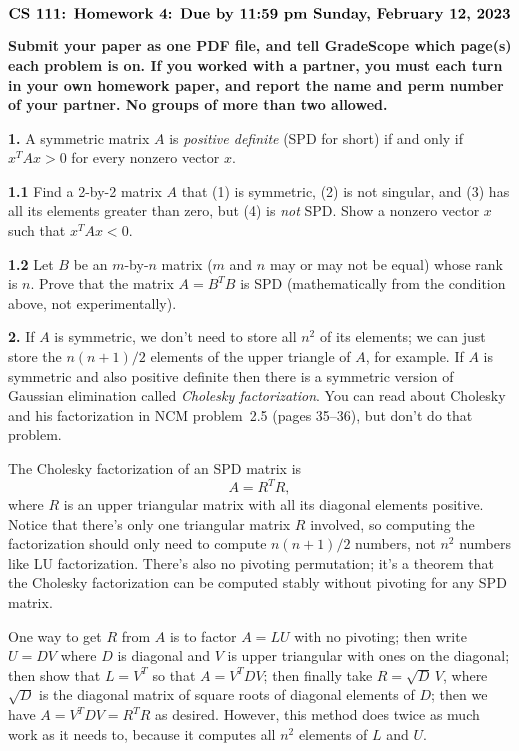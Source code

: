 \documentclass[11pt]{article}
\begin{document}
$$\mbox{\Large \bf CS 111: Homework 4: Due by 11:59 pm Sunday, February 12, 2023}$$
\par\smallskip\noindent
{\bf Submit your paper as one PDF file,
and tell GradeScope which page(s) each problem is on.
If you worked with a partner, you must each turn in your own 
homework paper, and report the name and perm number of your partner.
No groups of more than two allowed.
}

\par\bigskip
{\bf 1.} A symmetric matrix $A$ is {\em positive definite}
(SPD for short) if and only if $x^TAx>0$ for every nonzero vector $x$.

\par\medskip
{\bf 1.1} Find a 2-by-2 matrix $A$ that (1) is symmetric, (2) is not singular,
and (3) has all its elements greater than zero, but (4) is {\em not} SPD.
Show a nonzero vector $x$ such that $x^TAx<0$.

\par\medskip
{\bf 1.2} Let $B$ be an $m$-by-$n$ matrix ($m$ and $n$ may or may not be equal) 
whose rank is $n$.
Prove that the matrix $A=B^TB$ is SPD (mathematically from the condition above, 
not experimentally).

\par\bigskip
{\bf 2.} 
If $A$ is symmetric, we don't need to store all $n^2$ of its elements; 
we can just store the $n(n+1)/2$ elements of the upper triangle of $A$, for example.
If $A$ is symmetric and also positive definite then there is a symmetric
version of Gaussian elimination called {\em Cholesky factorization}.
You can read about Cholesky and his factorization in NCM problem~2.5 (pages 35--36),
but don't do that problem. 

The Cholesky factorization of an SPD matrix is
$$A = R^TR,$$
where $R$ is an upper triangular matrix with all its diagonal elements positive.
Notice that there's only one triangular matrix $R$ involved, so computing
the factorization should only need to compute $n(n+1)/2$ numbers, 
not $n^2$ numbers like LU factorization.
There's also no pivoting permutation; 
it's a theorem that the Cholesky factorization can be computed stably
without pivoting for any SPD matrix.

One way to get $R$ from $A$ is to factor $A=LU$ with no pivoting;
then write $U = DV$ where $D$ is diagonal and $V$ is upper triangular with
ones on the diagonal; then show that $L=V^T$ so that $A=V^TDV$; 
then finally take $R=\sqrt D\, V$, where $\sqrt D$ is the diagonal matrix
of square roots of diagonal elements of $D$; 
then we have $A=V^TDV=R^TR$ as desired.
However, this method does twice as much work as it needs to, 
because it computes all $n^2$ elements of $L$ and $U$.
\end{document}

